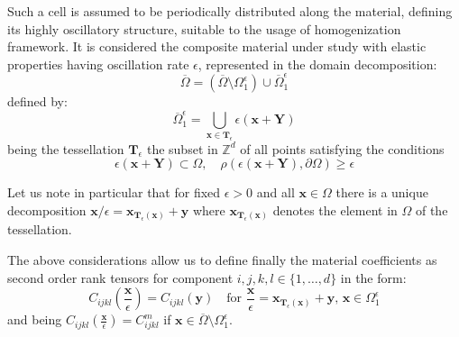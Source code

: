 Such a cell is assumed to be periodically distributed along the material, defining its highly oscillatory structure, suitable to the usage of homogenization framework. It is considered the composite material under study with elastic properties having oscillation rate $\epsilon$, represented in the domain decomposition:
\begin{equation*}
	\overline{\Omega} = (\overline{\Omega}\setminus \Omega_1^{\epsilon}) \cup \overline{\Omega}^{\epsilon}_1
\end{equation*}
defined by:
\begin{equation*}
    \overline{\Omega}^{\epsilon}_1 = \bigcup_{\mathbf{x} \in \mathbf{T}_{\epsilon}} \epsilon ( \mathbf{x} + \mathbf{Y} )
\end{equation*}
being the tessellation $\mathbf{T}_{\epsilon}$ the subset in $\mathbb{Z}^d$ of all points satisfying the conditions
\begin{equation*}
    \epsilon (\mathbf{x} + \mathbf{Y}) \subset \Omega, \quad \rho(\epsilon(\mathbf{x}+\mathbf{Y}), \partial \Omega) \geq \epsilon
\end{equation*}

Let us note in particular that for fixed $\epsilon >0$ and all $\mathbf{x} \in \Omega$ there is a unique decomposition $\mathbf{x}/\epsilon = \mathbf{x}_{\mathbf{T}_{\epsilon}(\mathbf{x})} + \mathbf{y}$ where $\mathbf{x}_{\mathbf{T}_{\epsilon}(\mathbf{x})}$ denotes the element in $\Omega$ of the tessellation.

The above considerations allow us to define finally the material coefficients as second order rank tensors for component $i,j,k,l \in \{1,\dots, d\}$ in the form:
\begin{equation*}
    C_{ijkl}(\frac{\mathbf{x}}{\epsilon}) = C_{ijkl}(\mathbf{y}) \quad \text{for } \frac{\mathbf{x}}{\epsilon} = \mathbf{x}_{\mathbf{T}_{\epsilon}(\mathbf{x})} + \mathbf{y}, \, \mathbf{x} \in \Omega_1^{\epsilon}
\end{equation*}
and being $C_{ijkl}(\frac{\mathbf{x}}{\epsilon}) = C^m_{ijkl}$ if $\mathbf{x} \in \overline{\Omega} \setminus \Omega_1^{\epsilon}$.

